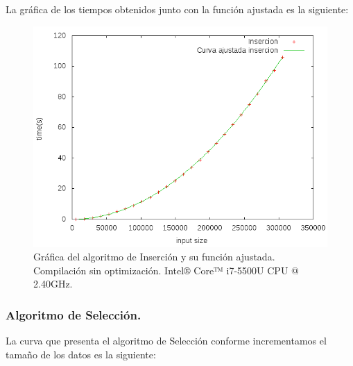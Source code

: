 \documentclass[11pt,a4paper]{article}
\begin{document}
\newpage

				\par
				La gráfica de los tiempos obtenidos junto con la función ajustada es la siguiente:

				\begin{figure}[h]

					\centering
					\includegraphics[width=1\textwidth]{insercion_ajustado.png}
					\caption{Gráfica del algoritmo de Inserción y su función ajustada. Compilación sin optimización. Intel® Core™ i7-5500U CPU @ 2.40GHz.}

				\end{figure}

\newpage

			\subsubsection{Algoritmo de Selección.}

				\par
				La curva que presenta el algoritmo de Selección conforme incrementamos el tamaño de los datos es la siguiente:
\end{document}

